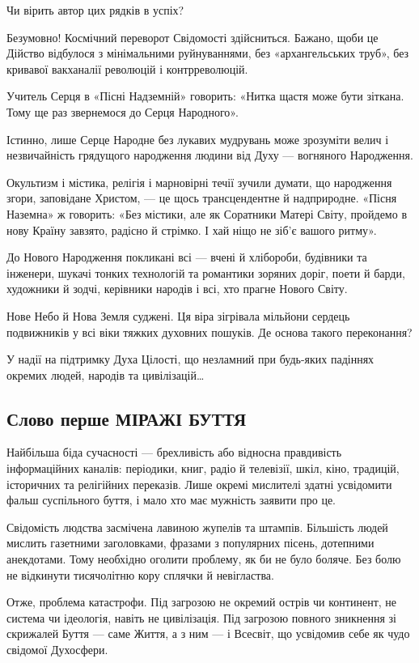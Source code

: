 Чи вірить автор цих рядків в успіх?

Безумовно! Космічний переворот Свідомості здійсниться. Бажано, щоби це Дійство
відбулося з мінімальними руйнуваннями, без «архангельських труб», без кривавої
вакханалії революцій і контрреволюцій.

Учитель Серця в «Пісні Надземній» говорить: «Нитка щастя може бути зіткана.
Тому ще раз звернемося до Серця Народного».

Істинно, лише Серце Народне без лукавих мудрувань може зрозуміти велич і
незвичайність грядущого народження людини від Духу — вогняного Народження.

Окультизм і містика, релігія і марновірні течії зучили думати, що народження
згори, заповідане Христом, — це щось трансцендентне й надприродне. «Пісня
Наземна» ж говорить: «Без містики, але як Соратники Матері Світу, пройдемо в
нову Країну завзято, радісно й стрімко. І хай ніщо не зіб’є вашого ритму».

До Нового Народження покликані всі — вчені й хлібороби, будівники та інженери,
шукачі тонких технологій та романтики зоряних доріг, поети й барди, художники й
зодчі, керівники народів і всі, хто прагне Нового Світу.

Нове Небо й Нова Земля суджені. Ця віра зігрівала мільйони сердець подвижників
у всі віки тяжких духовних пошуків. Де основа такого переконання?

У надії на підтримку Духа Цілості, що незламний при будь-яких падіннях окремих
людей, народів та цивілізацій…

\subsection{Слово перше МІРАЖІ БУТТЯ}

Найбільша біда сучасності — брехливість або відносна правдивість інформаційних
каналів: періодики, книг, радіо й телевізії, шкіл, кіно, традицій, історичних
та релігійних переказів. Лише окремі мислителі здатні усвідомити фальш
суспільного буття, і мало хто має мужність заявити про це.

Свідомість людства засмічена лавиною жупелів та штампів. Більшість людей
мислить газетними заголовками, фразами з популярних пісень, дотепними
анекдотами. Тому необхідно оголити проблему, як би не було боляче. Без болю не
відкинути тисячолітню кору сплячки й невігластва.

Отже, проблема катастрофи. Під загрозою не окремий острів чи континент, не
система чи ідеологія, навіть не цивілізація. Під загрозою повного зникнення зі
скрижалей Буття — саме Життя, а з ним — і Всесвіт, що усвідомив себе як чудо
свідомої Духосфери.

